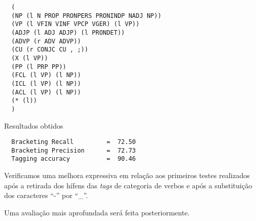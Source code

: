 \scriptsize

\begin{verbatim}
  (
  (NP (l N PROP PRONPERS PRONINDP NADJ NP))
  (VP (l VFIN VINF VPCP VGER) (l VP))
  (ADJP (l ADJ ADJP) (l PRONDET))
  (ADVP (r ADV ADVP))
  (CU (r CONJC CU , ;))
  (X (l VP))
  (PP (l PRP PP))
  (FCL (l VP) (l NP))
  (ICL (l VP) (l NP))
  (ACL (l VP) (l NP))
  (* (l))
  )
\end{verbatim}


Resultados obtidos


\begin{verbatim}
  Bracketing Recall         =  72.50
  Bracketing Precision      =  72.73
  Tagging accuracy          =  90.46
\end{verbatim}

\normalsize
Verificamos uma melhora expressiva em relação aos primeiros testes realizados após a retirada dos hífens das \emph{tags} de categoria de verbos e após a substituição dos caracteres ``{-}'' por ``\_''.

Uma avaliação mais aprofundada será feita posteriormente. 
